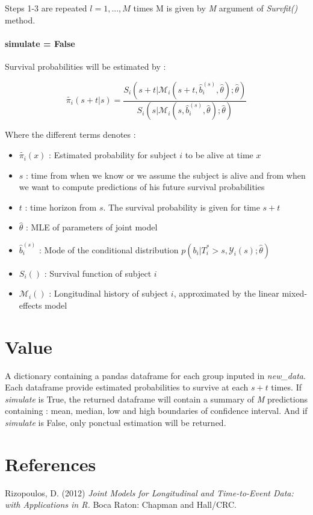 \documentclass[11pt, oneside]{article}   	%
\providecommand{\tightlist}{%
      \setlength{\itemsep}{0pt}\setlength{\parskip}{0pt}}
\begin{document}
Steps 1-3 are repeated \(l = 1,...,M\) times M is given by \emph{M}
argument of \emph{Survfit()} method.

\paragraph{simulate = False}\label{simulate-false}

Survival probabilities will be estimated by :

\[
\tilde{\pi_i}(s+t | s) = \frac
    {S_i(s+t | \mathcal{M}_i(s+t, \hat{b}_i^{(s)}, \hat{\theta}); \hat{\theta})}
    {S_i(s | \mathcal{M}_i(s, \hat{b}_i^{(s)}, \hat{\theta}); \hat{\theta})}
\]

Where the different terms denotes :

\begin{itemize}
\tightlist
\item
  \(\tilde{\pi_i}(x)\) : Estimated probability for subject \(i\) to be
  alive at time \(x\)
\item
  \(s\) : time from when we know or we assume the subject is alive and
  from when we want to compute predictions of his future survival
  probabilities
\item
  \(t\) : time horizon from \(s\). The survival probability is given for
  time \(s+t\)
\item
  \(\hat{\theta}\) : MLE of parameters of joint model
\item
  \(\hat{b}_i^{(s)}\) : Mode of the conditional distribution
  \(p(b_i | T_i^* > s, \mathcal{Y}_i(s); \hat{\theta})\)
\item
  \(S_i()\) : Survival function of subject \(i\)
\item
  \(\mathcal{M}_i()\) : Longitudinal history of subject \(i\),
  approximated by the linear mixed-effects model
\end{itemize}









\section{Value}\label{value}

A dictionary containing a pandas dataframe for each group inputed in
\emph{new\_data}. Each dataframe provide estimated probabilities to
survive at each \(s+t\) times. If \emph{simulate} is True, the returned
dataframe will contain a summary of \emph{M} predictions containing :
mean, median, low and high boundaries of confidence interval. And if
\emph{simulate} is False, only ponctual estimation will be returned.









\section{References}\label{references}

Rizopoulos, D. (2012) \emph{Joint Models for Longitudinal and
Time-to-Event Data: with Applications in R.} Boca Raton: Chapman and
Hall/CRC.
\end{document}
